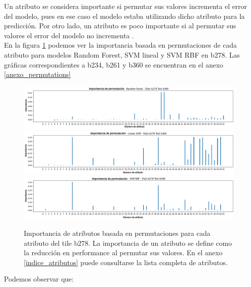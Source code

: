 Un atributo se considera importante si permutar sus valores incrementa el error del modelo, pues en ese caso el modelo estaba utilizando dicho atributo para la predicción. Por otro lado, un atributo es poco importante si al permutar sus valores el error del modelo no incrementa \cite{molnar2019}. \\

En la figura \ref{fig:importance_permutation_b278} podemos ver la importancia basada en permutaciones de cada atributo para modelos Random Forest, SVM lineal y SVM RBF en b278. Las gráficas correspondientes a b234, b261 y b360 se encuentran en el anexo \ref{anexo_permutations} 

\begin{figure}[h!]
\centering
  \includegraphics[width=1\textwidth]{Kap6/test=b278RF_permutation_variable_importance_scores.png} \\
  \includegraphics[width=1\textwidth]{Kap6/test=b278L_permutation_variable_importance_scores.png} \\
  \includegraphics[width=1\textwidth]{Kap6/test=b278RBF_permutation_variable_importance_scores.png}
  
\caption{ Importancia de atributos basada en permutaciones para cada atributo del tile b278. La importancia de un atributo se define como la reducción en performance al permutar sus valores. En el anexo \protect\ref{indice_atributos} puede consultarse la lista completa de atributos. }
\label{fig:importance_permutation_b278}
\end{figure}

Podemos observar que:

